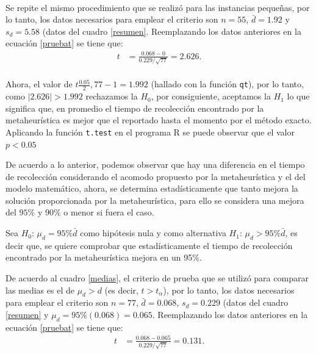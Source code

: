 \documentclass[preprint,12pt, pdftex]{elsarticle}
\begin{document}

 \\

Se repite el mismo procedimiento que se realizó para las instancias pequeñas, por lo tanto, los datos necesarios para emplear el criterio son $n = 55$, $\bar{d} = 1.92$ y $s_{d} = 5.58$ (datos del cuadro \ref{resumen}. Reemplazando los datos anteriores en la ecuación \ref{pruebat} se tiene que:
\begin{align}
\nonumber
    t & =  \frac{0.068 - 0}{0.229/\sqrt{77}} = 2.626. \\ \nonumber
\end{align}

Ahora, el valor de $t\frac{0.05}{2}, 77-1 = 1.992$ (hallado con la función \texttt{qt}), por lo tanto, como $|2.626| > 1.992$ rechazamos la $H_{0}$, por consiguiente, aceptamos la $H_{1}$ lo que significa que, en promedio el tiempo de recolección encontrado por la metaheurística es mejor que el reportado hasta el momento por el método exacto. Aplicando la función \texttt{t.test} en el programa R se puede observar que el valor $p < 0.05$


De acuerdo a lo anterior, podemos observar que hay una diferencia en el tiempo de recolección considerando el acomodo propuesto por la metaheurística y el del modelo matemático, ahora, se determina estadísticamente que tanto mejora la solución proporcionada por la metaheurística, para ello se considera una mejora del $95\%$ y $90\%$ o menor si fuera el caso.

Sea $H_{0}$: $\mu_{d} = 95\%\bar{d}$ como hipótesis nula y como alternativa $H_{1}$: $\mu_{d} > 95\%\bar{d}$, es decir que, se quiere comprobar que estadísticamente el tiempo de recolección encontrado por la metaheurística mejora en un 95\%.

De acuerdo al cuadro \ref{medias}, el criterio de prueba que se utilizó para comparar las medias es el de $\mu_{d} > d$ (es decir, $t > t_{\alpha}$), por lo tanto, los datos necesarios para emplear el criterio son $n = 77$, $\bar{d} = 0.068$, $s_{d} = 0.229$ (datos del cuadro \ref{resumen} y $\mu_{d} = 95\%(0.068) = 0.065$. Reemplazando los datos anteriores en la ecuación \ref{pruebat} se tiene que:
\begin{align}
\nonumber
    t & =  \frac{0.068 - 0.065}{0.229/\sqrt{77}} =  0.131. \\ \nonumber
\end{align}
\end{document}
